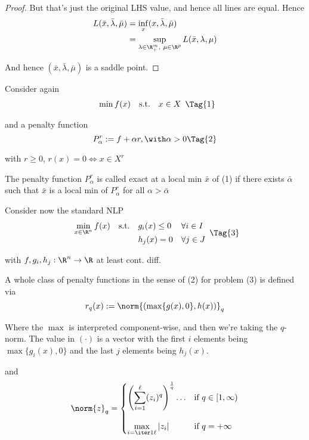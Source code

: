 \begin{proof}
  But that's just the original LHS value, and hence all lines are equal. Hence
  \begin{align*}
    L(\bar x,\bar\lambda,\bar\mu)
     & =\inf_{x} (x,\bar\lambda,\bar\mu)                          \\
     & =\sup_{\lambda\in\R^m_+,\ \mu\in\R^p}L(\bar x,\lambda,\mu) \\
  \end{align*}

  And hence $(\bar x,\bar\lambda,\bar\mu)$ is a saddle point.
\end{proof}



Consider again
\begin{equation*}
  \begin{array}{l l l}
    \min f(x) & \text{s.t.} & x\in X
  \end{array}\Tag{1}
\end{equation*}

and a penalty function
\begin{equation*}
  P_\alpha^r:=f+\alpha r,\with \alpha>0\Tag{2}
\end{equation*}

with $r\geq0$, $r(x)=0\iff x\in X^r$

\label{de3d5ee}

The penalty function $P_\alpha^r$ is called exact at a local min $\bar x$ of
(1) if there exists $\bar\alpha$ such that $\bar x$ is a local min of
$P_\alpha^r$ for all $\alpha>\bar\alpha$

Consider now the standard NLP
\begin{equation*}
  \NlpStdForm\Tag{3}
\end{equation*}

with $f,g_i,h_j:\R^n\to\R$ at least cont. diff.

A whole class of penalty functions in the sense of (2) for problem (3) is
defined via
$$
  r_q(x):=\norm{(\max\{g(x),0\},h(x))}_q
$$

Where the $\max$ is interpreted component-wise, and then we're taking the
$q$-norm. The value in $(\cdot)$ is a vector with the first $i$ elements being
$\max\{g_i(x),0\}$ and the last $j$ elements being $h_j(x)$.

and
$$
  \norm{z}_q=\begin{cases}
    \displaystyle\left(\sum_{i=1}^\ell (z_i)^q \right)^{\frac1q} \ldots
                                          & \text{if } q\in[1,\infty) \\[2em]
    \displaystyle\max_{i=\iter1\ell}|z_i| & \text{if } q=+\infty
  \end{cases}
$$

